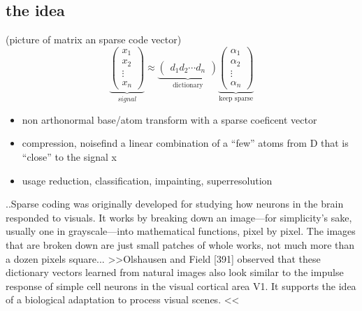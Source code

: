 \subsection{the idea}
\begin{frame}
(picture of matrix an sparse code vector)
\[
\underbrace{\begin{pmatrix} x_1 \\ x_2 \\ \vdots \\ x_n \end{pmatrix}}_{signal} \approx \underbrace{\begin{pmatrix} d_1  d_2 \cdots d_n \end{pmatrix}}_{\textrm{dictionary}}
\underbrace{\begin{pmatrix} \alpha_1 \\ \alpha_2 \\ \vdots \\ \alpha_n \end{pmatrix}}_{\textrm{keep sparse}}
\]
\begin{itemize}
\item non arthonormal base/atom transform with a sparse coeficent vector
\item compression, noisefind a linear combination of a “few” atoms from
D that is “close” to the signal x
\item usage reduction, classification, impainting,  superresolution
\end{itemize}

\end{frame}

\begin{frame}
..Sparse coding was originally developed for studying how neurons in the brain responded to visuals. It works by breaking down an image—for simplicity's sake, usually one in grayscale—into mathematical functions, pixel by pixel. The images that are broken down are just small patches of whole works, not much more than a dozen pixels square...
>>Olshausen and Field [391] observed that these
dictionary vectors learned from natural images also look similar to the impulse
response of simple cell neurons in the visual cortical area V1. It supports the idea
of a biological adaptation to process visual scenes. <<
\end{frame}

